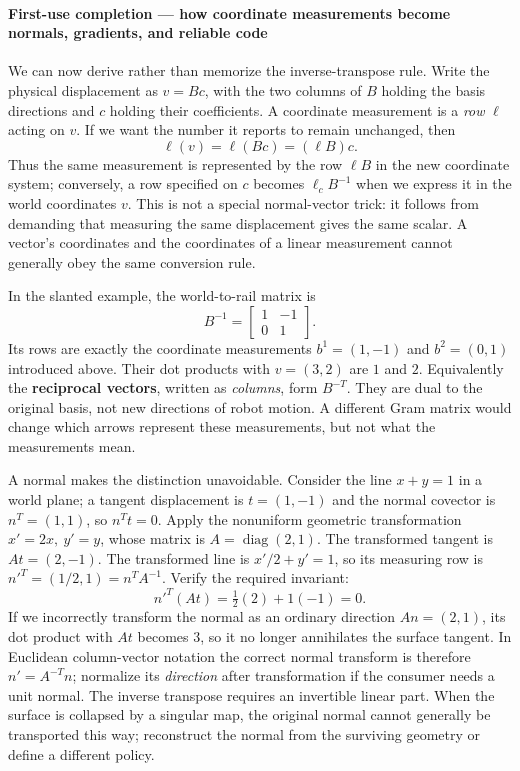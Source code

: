 \paragraph{First-use completion --- how coordinate measurements become normals, gradients, and reliable code}\label{01-foundations-i-ch017-first-use-completion-how-coordinate-measurements-become-normals-gradients-and-reliable-code}

\hypertarget{01-foundations-i-ch017-first-use-completion-how-coordinate-measurements-become-normals-gradients-and-reliable-code}{}

We can now derive rather than memorize the inverse-transpose rule. Write the physical displacement as \(v=Bc\), with the two columns of \(B\) holding the basis directions and \(c\) holding their coefficients. A coordinate measurement is a \emph{row} \(\ell\) acting on \(v\). If we want the number it reports to remain unchanged, then \[
\ell(v)=\ell(Bc)=(\ell B)c.
\] Thus the same measurement is represented by the row \(\ell B\) in the new coordinate system; conversely, a row specified on \(c\) becomes \(\ell_c B^{-1}\) when we express it in the world coordinates \(v\). This is not a special normal-vector trick: it follows from demanding that measuring the same displacement gives the same scalar. A vector's coordinates and the coordinates of a linear measurement cannot generally obey the same conversion rule.

In the slanted example, the world-to-rail matrix is \[
B^{-1}=\begin{bmatrix}1&-1\\0&1\end{bmatrix}.
\] Its rows are exactly the coordinate measurements \(b^1=(1,-1)\) and \(b^2=(0,1)\) introduced above. Their dot products with \(v=(3,2)\) are \(1\) and \(2\). Equivalently the \textbf{reciprocal vectors}, written as \emph{columns}, form \(B^{-T}\). They are dual to the original basis, not new directions of robot motion. A different Gram matrix would change which arrows represent these measurements, but not what the measurements mean.

A normal makes the distinction unavoidable. Consider the line \(x+y=1\) in a world plane; a tangent displacement is \(t=(1,-1)\) and the normal covector is \(n^T=(1,1)\), so \(n^Tt=0\). Apply the nonuniform geometric transformation \(x'=2x,\ y'=y\), whose matrix is \(A=\operatorname{diag}(2,1)\). The transformed tangent is \(At=(2,-1)\). The transformed line is \(x'/2+y'=1\), so its measuring row is \(n'^T=(1/2,1)=n^TA^{-1}\). Verify the required invariant: \[
n'^T(At)=\tfrac12(2)+1(-1)=0.
\] If we incorrectly transform the normal as an ordinary direction \(An=(2,1)\), its dot product with \(At\) becomes \(3\), so it no longer annihilates the surface tangent. In Euclidean column-vector notation the correct normal transform is therefore \(n'=A^{-T}n\); normalize its \emph{direction} after transformation if the consumer needs a unit normal. The inverse transpose requires an invertible linear part. When the surface is collapsed by a singular map, the original normal cannot generally be transported this way; reconstruct the normal from the surviving geometry or define a different policy.

